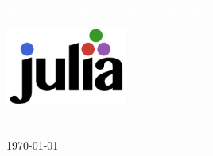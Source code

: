 
\begin{titlingpage}
    \BgThispage

    \vspace*{2cm}\noindent
    \textcolor{white}{ \MainHeading  \DocMainTitle } 
    \\[0.6cm]
    \textcolor{white}{
        \SecondaryHeading A fresh approach to technical computing.
    }
    \vspace*{3cm}\par\noindent


    \begin{center}
        \includegraphics[width=0.3\textwidth]{./titlepage/logo} 
        \\[1.5cm]

        { \SecondaryHeading  \DocVersion} 
        \\[1.5cm]
        { \huge  \DocAuthors }
        \\[0.5cm]
        { \huge \today }
    \end{center} 
\end{titlingpage}
\restoregeometry
